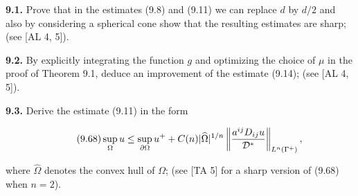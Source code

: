 \noindent\textbf{9.1.} \enspace Prove that in the estimates (9.8) and (9.11) we can replace $d$ by $d/2$ and also
by considering a spherical cone show that the resulting estimates are sharp; (see
[AL 4, 5]).

\medskip

\noindent\textbf{9.2.} \enspace By explicitly integrating the function $g$ and optimizing the choice of $\mu$ in the
proof of Theorem 9.1, deduce an improvement of the estimate (9.14); (see [AL 4, 5]).

\medskip

\noindent\textbf{9.3.} \enspace Derive the estimate (9.11) in the form

\begin{equation}
\tag{9.68}
\sup_{\Omega} u \le \sup_{\partial \Omega} u^+ + C(n) |\widehat{\Omega}|^{1/n}
\left\|\frac{a^{ij}D_{ij}u}{\mathcal{D}^*}\right\|_{L^n(\Gamma^+)} ,
\end{equation}

where $\widehat{\Omega}$ denotes the convex hull of $\Omega$; (see [TA 5] for a sharp version of (9.68) when
$n = 2$).



